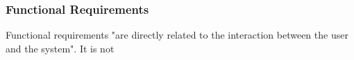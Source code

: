 \subsubsection{Functional Requirements}
Functional requirements "are directly related to the interaction between the user and the system"\cite{aauFunctionalRequirements}. It is not 
